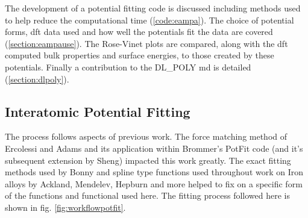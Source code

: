 The development of a potential fitting code is discussed including methods used to help reduce the computational time (\ref{code:eampa}).  The choice of potential forms, \acrshort{dft} data used and how well the potentials fit the data are covered (\ref{section:eampause}).  The Rose-Vinet plots are compared, along with the \acrshort{dft} computed bulk properties and surface energies, to those created by these potentials.  Finally a contribution to the DL\_POLY \acrshort{md} is detailed (\ref{section:dlpoly}).



\subsection{Interatomic Potential Fitting}

The process follows aspects of previous work.  The force matching method of Ercolessi and Adams\cite{forcematchingmethod} and its application within Brommer's PotFit code\cite{pbrommer} (and it's subsequent extension by Sheng\cite{shengeam}) impacted this work greatly.  The exact fitting methods used by Bonny and spline type functions used throughout work on Iron alloys by Ackland, Mendelev, Hepburn and more helped to fix on a specific form of the functions and functional used here.  The fitting process followed here is shown in fig. \ref{fig:workflowpotfit}.

